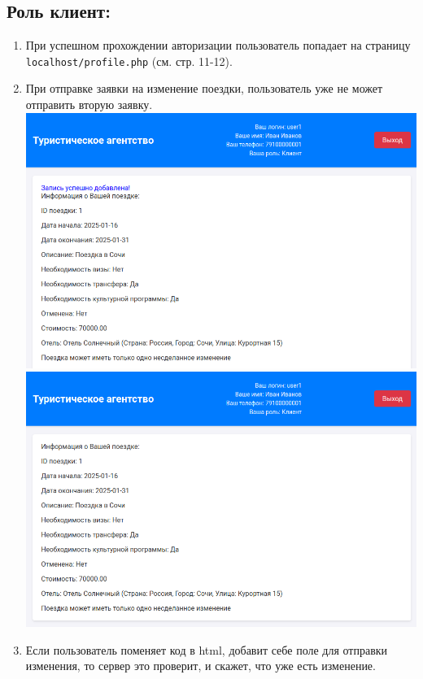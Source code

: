 \documentclass[a4paper,12pt]{article}
\begin{document}
\subsection{Роль клиент:}
\begin{enumerate}
    \item При успешном прохождении авторизации пользователь попадает на страницу \texttt{localhost/profile.php} (см. стр. 11-12). \\
    \item При отправке заявки на изменение поездки, пользователь уже не может отправить вторую заявку. \\
          \includegraphics[scale=0.5]{media/client/success_change.png} \\
          \includegraphics[scale=0.5]{media/client/change_after_reload.png} \\
    \item Если пользователь поменяет код в html, добавит себе поле для отправки изменения, то сервер это проверит, и скажет, что уже есть изменение. \\

\end{enumerate}
\end{document}
